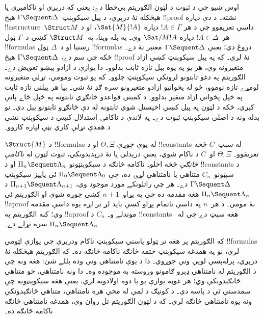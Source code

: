 \documentclass[../../../include/open-logic-section]{subfiles}
\begin{document}


اوس ښيو چې د ثبوت د لټون الګوريتم بې‌خطا دے: يعنې که
درېږي او ناکامېږي يا هېڅکله نۀ درېږي، د پيل
سيکوېنټ~$\Gamma \Sequent \Delta$ هېڅ !!{proof} نشته۔ د دې
دپاره !!a{structure}~$\Struct M$ داسې تعريفوو چې د هر
$!A \in \Gamma$ دپاره $\Sat{M}{!A}$، او د هر~$!A \in \Delta$
دپاره $\Sat/{M}{!A}$ وي۔ په بله وينا، په~$\Struct M$ کښې
د~$\Gamma$ ټول !!{formula}s رښتيا او د~$\Delta$ ټول
!!{formula}s دروغ دي؛ يعنې $\Gamma \Sequent \Delta$ معتبر
نۀ دے۔ ځکه چې  سم دے، $\Gamma \Sequent \Delta$
هېڅ !!{proof} نۀ لري۔
که په پيل سيکوېنټ کښې ازاد متغيرونه وي، هر يو په يوه بېل تازه ثابت بدلوو۔ دا يوازې د ازادو پېښو تعويض دے۔ الګوريتم په دغو ثابتونو لرونکي سيکوېنټ چلوو۔ که يو ثبوت ومومي، تړلي متغيرونه لومړے تازه نوموو، څو له پخوانيو ازادو متغيرونو سره ګډ نۀ شي۔ بيا هر پيلنی تازه ثابت په خپل پخواني ازاد متغير بدلوو۔ د کميتي قواعدو ځانګړي ثابتونه په خپل ځاے پاتې کېږي، ځکه د لټون په پيل کښې اخيستل شوي ثابتونه له دې ځانګړو ثابتونو بېل دي۔ نو بدله ونه د اصلي سيکوېنټ ثبوت دے۔ په لاندې د ناکامۍ استدلال کښې د سيکوېنټ نښې د همدې تړلې کاري بڼې لپاره کاروو۔

$\Struct{M}$ د !!{formula}s له يوې جوړې $\Theta, \Xi$
او د !!{constant}s له سېټ~$C$ څخه تعريفوو۔ $\Theta, \Xi$ او~$C$
د ناکام شوي، يعنې درېدلي يا نۀ درېدېدونکي، ثبوت لټون له
\emph{ناکامې څانګې} څخه اخلو۔ ناکامه څانګه د سيکوېنټونو
$\Pi_n \Sequent \Lambda_n$ او د !!{constant}s د سېټونو~$C_n$
متناهي يا نامتناهي لړۍ ده، چې $\Pi_0 \Sequent \Lambda_0$
ئې پاييز سيکوېنټ $\Gamma \Sequent \Delta$ دے۔ هر چې راتلونکے
مورد موجود وي، $\Pi_{n+1} \Sequent \Lambda_{n+1}$ د
$\Pi_n \Sequent \Lambda_n$ هغه مقدمه ده چې په پړاو~$n+1$
کښې جوړه شوې او الګوريتم ئې !!a{proof} نۀ مومي۔ د هر~$n$ په داسې
ناتمام پړاو کښې بايد لږ تر لږه يوه داسې مقدمه وي؛ کنه
الګوريتم به !!a{proof} موندلے و۔ $C_n$ د !!{constant}s هغه
سېټ دے چې له~$\Pi_n \Sequent \Lambda_n$ سره تړلے دے۔

که الګوريتم پر هغه تر ټولو پاسني سيکوېنټ ناکام ودرېږي
چې يوازې اټومي !!{formula}s لري، نو په همدغه سيکوېنټ ختمه
څانګه ناکامه څانګه ده۔ که الګوريتم هېڅکله نۀ درېږي، پرله‌پسې
لويې ونې جوړوي۔ دا د يوې نامتناهي ونې وده بللے شئ: هغه ونه
چې د الګوريتم له نامتناهي ډېرو ګامونو وروسته به موجوده وه۔
دا ونه نامتناهي، خو متناهي څانګېدونکې وي؛ هر غوټه يوازې يو
يا دوه اولادونه لري، يعنې هغه سيکوېنټونه چې سمدستي ئې د
پاسه دي۔ د کونيګ د لمې له مخې هره نامتناهي، متناهي
څانګېدونکې ونه يوه نامتناهي څانګه لري۔ که د لټون الګوريتم
تل روان وي، همدغه نامتناهي څانګه ناکامه څانګه ده۔
\end{document}
